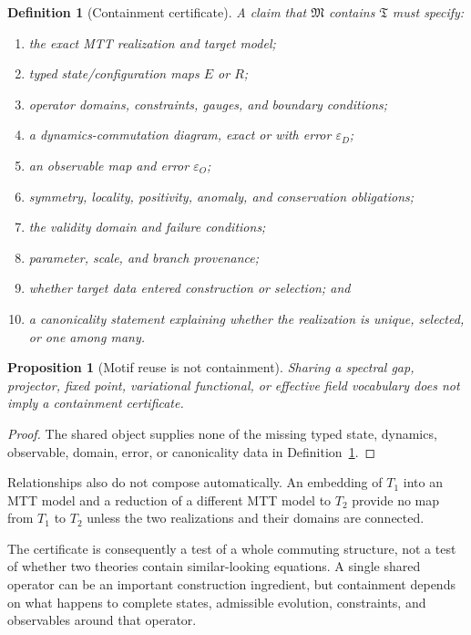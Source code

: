 \documentclass[11pt]{article}
\newtheorem{proposition}[theorem]{Proposition}
\newtheorem{definition}[theorem]{Definition}
\begin{document}
\begin{definition}[Containment certificate]\label{def:certificate}
A claim that $\mathfrak M$ contains $\mathfrak T$ must specify:
\begin{enumerate}
\item the exact MTT realization and target model;
\item typed state/configuration maps $E$ or $R$;
\item operator domains, constraints, gauges, and boundary conditions;
\item a dynamics-commutation diagram, exact or with error $\varepsilon_D$;
\item an observable map and error $\varepsilon_O$;
\item symmetry, locality, positivity, anomaly, and conservation obligations;
\item the validity domain and failure conditions;
\item parameter, scale, and branch provenance;
\item whether target data entered construction or selection; and
\item a canonicality statement explaining whether the realization is unique,
selected, or one among many.
\end{enumerate}
\end{definition}

\begin{proposition}[Motif reuse is not containment]
Sharing a spectral gap, projector, fixed point, variational functional, or
effective field vocabulary does not imply a containment certificate.
\end{proposition}

\begin{proof}
The shared object supplies none of the missing typed state, dynamics,
observable, domain, error, or canonicality data in
Definition~\ref{def:certificate}.
\end{proof}

Relationships also do not compose automatically. An embedding of $T_1$ into
an MTT model and a reduction of a different MTT model to $T_2$ provide no map
from $T_1$ to $T_2$ unless the two realizations and their domains are connected.

The certificate is consequently a test of a whole commuting structure, not a
test of whether two theories contain similar-looking equations.  A single
shared operator can be an important construction ingredient, but containment
depends on what happens to complete states, admissible evolution, constraints,
and observables around that operator.
\end{document}
